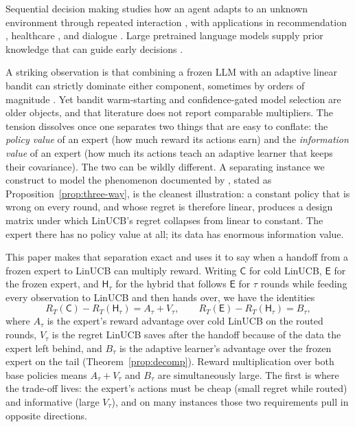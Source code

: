 \documentclass{article}
\theoremstyle{definition}
\theoremstyle{remark}
\theoremstyle{remark}
\newcommand{\Cold}{\mathsf{C}}
\newcommand{\Exp}{\mathsf{E}}
\newcommand{\Hyb}{\mathsf{H}}
\begin{document}
Sequential decision making studies how an agent adapts to an unknown
environment through repeated interaction \cite{zhu2022largeaction,zhu2022contextual},
with applications in recommendation \cite{li2010contextual,agarwal2016making},
healthcare \cite{tewari2017ads,svensson2023sequential}, and dialogue
\cite{li2016deep}. Large pretrained language models supply prior knowledge that
can guide early decisions
\cite{brown2020language,ouyang2022training,achiam2023gpt,
alamdari2024jumpstarting,abbasiyadkori2024believe}.

A striking observation is that combining a frozen LLM with an adaptive linear
bandit can strictly dominate either component, sometimes by orders of magnitude
\cite{chen2024llmdecision,huangcontextual}. Yet bandit warm-starting
\cite{bastani2021mostly,zhang2019warm} and confidence-gated model selection
\cite{auer2002nonstochastic,agarwal2017corralling,pacchiano2020model} are older
objects, and that literature does not report comparable multipliers. The
tension dissolves once one separates two things that are easy to conflate:
the \emph{policy value} of an expert (how much reward its actions earn) and
the \emph{information value} of an expert (how much its actions teach an
adaptive learner that keeps their covariance). The two can be wildly
different. A separating instance we construct to model the phenomenon
documented by \cite{chen2024llmdecision}, stated as
Proposition~\ref{prop:three-way}, is the cleanest illustration:
a constant policy that is wrong on every round, and whose regret is therefore
linear, produces a design matrix under which LinUCB's regret collapses from
linear to constant. The expert there has no policy value at all; its data has
enormous information value.

This paper makes that separation exact and uses it to say when a handoff from
a frozen expert to LinUCB can multiply reward. Writing $\Cold$ for cold LinUCB,
$\Exp$ for the frozen expert, and $\Hyb_\tau$ for the hybrid that follows
$\Exp$ for $\tau$ rounds while feeding every observation to LinUCB and then
hands over, we have the identities
\[
R_T(\Cold)-R_T(\Hyb_\tau)=A_\tau+V_\tau,
\qquad
R_T(\Exp)-R_T(\Hyb_\tau)=B_\tau,
\]
where $A_\tau$ is the expert's reward advantage over cold LinUCB on the routed
rounds, $V_\tau$ is the regret LinUCB saves after the handoff because of the
data the expert left behind, and $B_\tau$ is the adaptive learner's advantage
over the frozen expert on the tail (Theorem~\ref{prop:decomp}). Reward
multiplication over both base policies means $A_\tau+V_\tau$ and $B_\tau$ are
simultaneously large. The first is where the trade-off lives: the expert's
actions must be cheap (small regret while routed) and informative (large
$V_\tau$), and on many instances those two requirements pull in opposite
directions.
\end{document}
